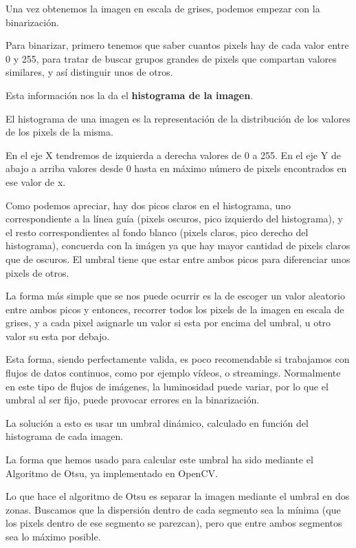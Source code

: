 Una vez obtenemos la imagen en escala de grises, podemos empezar con la binarización.

Para binarizar, primero tenemos que saber cuantos pixels hay de cada valor entre 0 y 255, para tratar de buscar grupos grandes de pixels que compartan valores similares, y así distinguir unos de otros. 

Esta información nos la da el \textbf{histograma de la imagen}.

El histograma de una imagen es la representación de la distribución de los valores de los pixels de la misma.

En el eje X tendremos de izquierda a derecha valores de 0 a 255. En el eje Y de abajo a arriba valores desde 0 hasta en máximo número de pixels encontrados en ese valor de x.


Como podemos apreciar, hay dos picos claros en el histograma, uno correspondiente a la línea guía (pixels oscuros, pico izquierdo del histograma), y el resto correspondientes al fondo blanco (pixels claros, pico derecho del histograma), concuerda con la imágen ya que hay mayor cantidad de pixels claros que de oscuros. El umbral tiene que estar entre ambos picos para diferenciar unos pixels de otros.

La forma más simple que se nos puede ocurrir es la de escoger un valor aleatorio entre ambos picos y entonces, recorrer todos los pixels de la imagen en escala de grises, y a cada pixel asignarle un valor si esta por encima del umbral, u otro valor su esta por debajo.

Esta forma, siendo perfectamente valida, es poco recomendable si trabajamos con flujos de datos continuos, como por ejemplo vídeos, o streamings.
Normalmente en este tipo de flujos de imágenes, la luminosidad puede variar, por lo que el umbral al ser fijo, puede provocar errores en la binarización.

La solución a esto es usar un umbral dinámico, calculado en función del histograma de cada imagen.

La forma que hemos usado para calcular este umbral ha sido mediante el Algoritmo de Otsu\cite{wikiotsu}, ya implementado en OpenCV.

Lo que hace el algoritmo de Otsu es separar la imagen mediante el umbral en dos zonas. Buscamos que la dispersión dentro de cada segmento sea la mínima (que los pixels dentro de ese segmento se parezcan), pero que entre ambos segmentos sea lo máximo posible.

